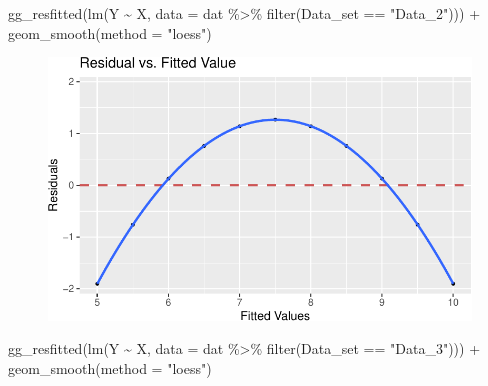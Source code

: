 \documentclass[
  letterpaper,
  DIV=11,
  numbers=noendperiod]{scrreprt}
\newenvironment{Shaded}{\begin{snugshade}}{\end{snugshade}}
\newcommand{\AttributeTok}[1]{\textcolor[rgb]{0.40,0.45,0.13}{#1}}
\newcommand{\FunctionTok}[1]{\textcolor[rgb]{0.28,0.35,0.67}{#1}}
\newcommand{\NormalTok}[1]{\textcolor[rgb]{0.00,0.23,0.31}{#1}}
\newcommand{\SpecialCharTok}[1]{\textcolor[rgb]{0.37,0.37,0.37}{#1}}
\newcommand{\StringTok}[1]{\textcolor[rgb]{0.13,0.47,0.30}{#1}}
\begin{document}
\begin{Shaded}
\begin{Highlighting}[]
\FunctionTok{gg\_resfitted}\NormalTok{(}\FunctionTok{lm}\NormalTok{(Y }\SpecialCharTok{\textasciitilde{}}\NormalTok{ X, }\AttributeTok{data =}\NormalTok{ dat }\SpecialCharTok{\%\textgreater{}\%} 
                  \FunctionTok{filter}\NormalTok{(Data\_set }\SpecialCharTok{==} \StringTok{"Data\_2"}\NormalTok{))) }\SpecialCharTok{+} 
  \FunctionTok{geom\_smooth}\NormalTok{(}\AttributeTok{method =} \StringTok{"loess"}\NormalTok{)}
\end{Highlighting}
\end{Shaded}

\begin{figure}[H]

{\centering \includegraphics{./08-linearreg_files/figure-pdf/unnamed-chunk-26-1.pdf}

}

\end{figure}

\begin{Shaded}
\begin{Highlighting}[]
\FunctionTok{gg\_resfitted}\NormalTok{(}\FunctionTok{lm}\NormalTok{(Y }\SpecialCharTok{\textasciitilde{}}\NormalTok{ X, }\AttributeTok{data =}\NormalTok{ dat }\SpecialCharTok{\%\textgreater{}\%} 
                  \FunctionTok{filter}\NormalTok{(Data\_set }\SpecialCharTok{==} \StringTok{"Data\_3"}\NormalTok{))) }\SpecialCharTok{+} 
  \FunctionTok{geom\_smooth}\NormalTok{(}\AttributeTok{method =} \StringTok{"loess"}\NormalTok{)}
\end{Highlighting}
\end{Shaded}
\end{document}
